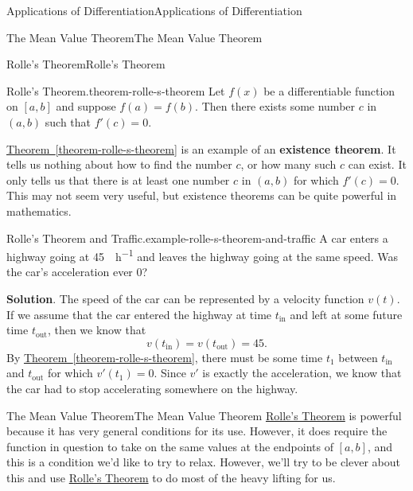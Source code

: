 \documentclass[10pt,]{book}
\newcommand{\terminology}[1]{\textbf{#1}}
\numberwithin{equation}{section}
\begin{document}
\begin{chapterptx}{Applications of Differentiation}{}{Applications of Differentiation}{}{}
\begin{sectionptx}{The Mean Value Theorem}{}{The Mean Value Theorem}{}{}
\begin{subsectionptx}{Rolle's Theorem}{}{Rolle's Theorem}{}{}
\begin{theorem}{Rolle's Theorem.}{}{theorem-rolle-s-theorem}%
\hypertarget{p-330}{}%
Let \(f(x)\) be a differentiable function on \([a,b]\) and suppose \(f(a) = f(b)\). Then there exists some number \(c\) in \((a,b)\) such that \(f'(c) = 0\).%
\end{theorem}
\hypertarget{p-331}{}%
\hyperref[theorem-rolle-s-theorem]{Theorem~\ref{theorem-rolle-s-theorem}} is an example of an \terminology{existence theorem}. It tells us nothing about how to find the number \(c\), or how many such \(c\) can exist. It only tells us that there is at least one number \(c\) in \((a,b)\) for which \(f'(c) = 0\). This may not seem very useful, but existence theorems can be quite powerful in mathematics.%
\begin{example}{Rolle's Theorem and Traffic.}{example-rolle-s-theorem-and-traffic}%
\hypertarget{p-332}{}%
A car enters a highway going at \SI{45}{\mile\per\hour} and leaves the highway going at the same speed. Was the car's acceleration ever \(0\)?%
\par\smallskip%
\noindent\textbf{Solution}.\hypertarget{solution-73}{}\quad%
\hypertarget{p-333}{}%
The speed of the car can be represented by a velocity function \(v(t)\). If we assume that the car entered the highway at time \(t_{\text{in}}\) and left at some future time \(t_{\text{out}}\), then we know that%
\begin{equation*}
v(t_{\text{in}}) = v(t_{\text{out}}) = 45.
\end{equation*}
By \hyperref[theorem-rolle-s-theorem]{Theorem~\ref{theorem-rolle-s-theorem}}, there must be some time \(t_{1}\) between \(t_{\text{in}}\) and \(t_{\text{out}}\) for which \(v'(t_{1}) = 0\). Since \(v'\) is exactly the acceleration, we know that the car had to stop accelerating somewhere on the highway.%
\end{example}
\end{subsectionptx}
%
%
\typeout{************************************************}
\typeout{************************************************}
%
\begin{subsectionptx}{The Mean Value Theorem}{}{The Mean Value Theorem}{}{}\label{subsection-the-mean-value-theorem}
\hypertarget{p-334}{}%
\hyperref[theorem-rolle-s-theorem]{Rolle's Theorem} is powerful because it has very general conditions for its use. However, it does require the function in question to take on the same values at the endpoints of \([a,b]\), and this is a condition we'd like to try to relax. However, we'll try to be clever about this and use \hyperref[theorem-rolle-s-theorem]{Rolle's Theorem} to do most of the heavy lifting for us.%

\end{subsectionptx}
\end{sectionptx}
\end{chapterptx}
\end{document}
